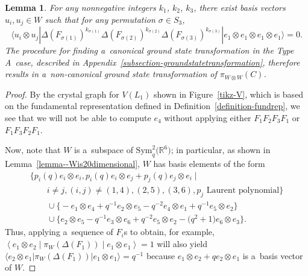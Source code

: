 \documentclass[pdftex]{sigma}
\numberwithin{equation}{section}
\newtheorem{Lemma}[Theorem]{Lemma}
\theoremstyle{definition}
\begin{document}
\begin{Lemma}
\label{lemma--groundstate}
 For any nonnegative integers $k_1$, $k_2$, $k_3$, there exist basis vectors $u_i, u_j \in W$ such that for any permutation $\sigma \in S_3$,
 \[\big\langle u_i \otimes u_j| \Delta(F_{\sigma(1)})^{k_{\sigma(1)}}\Delta(F_{\sigma(2)})^{k_{\sigma(2)}}\Delta(F_{\sigma(3)})^{k_{\sigma(3)}}| e_1 \otimes e_1 \otimes e_1 \otimes e_1 \big\rangle = 0.
 \]
 The procedure for finding a~canonical ground state transformation in the Type A~case, described in Appendix~{\rm\ref{subsection-groundstatetransformation}}, therefore results in a~non-canonical ground state transformation of $\pi_{W \otimes W}(C)$.
\end{Lemma}
\begin{proof}[Proof]
 By the crystal graph for $V(L_1)$ shown in Figure~\ref{tikz-V}, which is based on the fundamental representation defined in Definition~\ref{definition-fundrep}, we see that we will not be able to compute $e_4$ without applying either $F_1F_2F_3F_1$ or $F_1F_3F_2F_1$.

Now, note that $W$ is a~subspace of $\mathrm{Sym}^2_q\bigl(\mathbb{R}^6\bigr)$; in particular, as shown in Lemma~\ref{lemma--Wis20dimensional}, $W$ has basis elements of the form
\begin{gather*}
 \{ p_i(q)e_i \otimes e_i, p_i(q)e_i \otimes e_j+p_j(q)e_j \otimes e_i  \mid\\
 \qquad i \neq j, (i,j) \neq (1,4),(2,5),(3,6), p_j \text{ Laurent polynomial}\} \\
 \qquad \cup\bigl\{ -e_1 \otimes e_4 +q^{-1}e_2 \otimes e_5 - q^{-2}e_4 \otimes e_1+q^{-1}e_5 \otimes e_2\bigr\} \\
 \qquad \cup\bigl\{e_2 \otimes e_5 - q^{-1}e_3 \otimes e_6+q^{-2}e_5 \otimes e_2 -\bigl(q^2+1\bigr)e_6 \otimes e_3\bigr\}.
\end{gather*}
Thus, applying a~sequence of $F_i$s to obtain, for example, $\left\langle e_1 \otimes e_2 \middle| \pi_W(\Delta(F_1)) \middle| e_1 \otimes e_1 \right\rangle = 1$
will also yield
$
 \langle e_2 \otimes e_1| \pi_W(\Delta(F_1))| e_1 \otimes e_1 \rangle = q^{-1}
$
because $e_1 \otimes e_2+qe_2 \otimes e_1$ is a~basis vector of $W$.



\end{proof}
\end{document}
